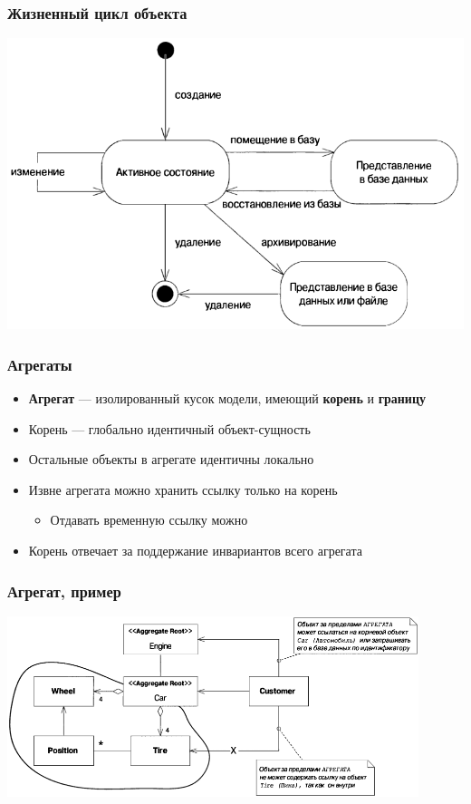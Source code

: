 \documentclass{../../slides-style}
\begin{document}
	\begin{frame}
		\frametitle{Жизненный цикл объекта}
		\begin{center}
			\includegraphics[height=0.7\textheight]{objectLifeCycle.png}
		\end{center}
	\end{frame}

	\begin{frame}
		\frametitle{Агрегаты}
		\begin{itemize}
			\item \textbf{Агрегат} --- изолированный кусок модели, имеющий \textbf{корень} и \textbf{границу}
			\item Корень --- глобально идентичный объект-сущность
			\item Остальные объекты в агрегате идентичны локально
			\item Извне агрегата можно хранить ссылку только на корень
			\begin{itemize}
				\item Отдавать временную ссылку можно
			\end{itemize}
			\item Корень отвечает за поддержание инвариантов всего агрегата
		\end{itemize}
	\end{frame}

	\begin{frame}
		\frametitle{Агрегат, пример}
		\begin{center}
			\includegraphics[width=0.9\textwidth]{aggregate.png}
		\end{center}
	\end{frame}
\end{document}
